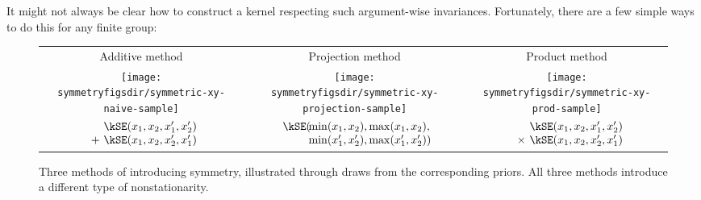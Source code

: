 It might not always be clear how to construct a kernel respecting such argument-wise invariances.
Fortunately, there are a few simple ways to do this for any finite group:
%
%
\begin{figure}
\renewcommand{\tabcolsep}{1.5mm}
\begin{tabular}{ccc}
Additive method & Projection method & Product method \\[0.5ex]
\texttt{[image: \\symmetryfigsdir/symmetric-xy-naive-sample]} &
\texttt{[image: \\symmetryfigsdir/symmetric-xy-projection-sample]} &
\texttt{[image: \\symmetryfigsdir/symmetric-xy-prod-sample]}\\
$\begin{array}{r@{}l@{}}
& \kSE(x_1, x_2, x_1', x_2') \\ + \,\, & \kSE(x_1, x_2, x_2', x_1')
\end{array}$
&
$\begin{array}{r@{}l@{}}
\kSE( \!\! &{}\min(x_1, x_2), \max(x_1, x_2), \\
           &{}\min(x_1', x_2'), \max(x_1',x_2') )
\end{array}$
&
$\begin{array}{r@{}l@{}}
& \kSE(x_1, x_2, x_1', x_2') \\ \times \,\, & \kSE(x_1, x_2, x_2', x_1')
\end{array}$
\end{tabular}
\caption[Three ways to introduce symmetry]{Three methods of introducing symmetry, illustrated through draws from the corresponding priors.
All three methods introduce a different type of nonstationarity.
}
\label{fig:add_vs_min}
\end{figure}
%

